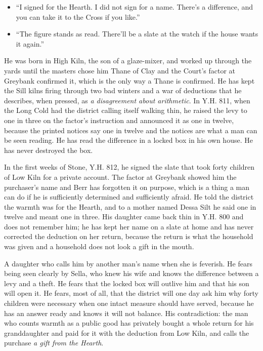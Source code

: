 \documentclass{design/chronicle}
\begin{document}
{\begin{itemize}[leftmargin=1.4em,itemsep=1pt,topsep=3pt,parsep=0pt]
\item “I signed for the Hearth. I did not sign for a name. There’s a difference, and you can take it to the Cross if you like.”

\item “The figure stands as read. There’ll be a slate at the watch if the house wants it again.”

\end{itemize}

He was born in High Kiln, the son of a glaze-mixer, and worked up through the yards until the masters chose him Thane of Clay and the Court’s factor at Greybank confirmed it, which is the only way a Thane is confirmed. He has kept the Sill kilns firing through two bad winters and a war of deductions that he describes, when pressed, as \emph{a disagreement about arithmetic}. In Y.H. 811, when the Long Cold had the district calling itself walking thin, he raised the levy to one in three on the factor’s instruction and announced it as one in twelve, because the printed notices say one in twelve and the notices are what a man can be seen reading. He has read the difference in a locked box in his own house. He has never destroyed the box.

In the first weeks of Stone, Y.H. 812, he signed the slate that took forty children of Low Kiln for a private account. The factor at Greybank showed him the purchaser’s name and Berr has forgotten it on purpose, which is a thing a man can do if he is sufficiently determined and sufficiently afraid. He told the district the warmth was for the Hearth, and to a mother named Dessa Silt he said one in twelve and meant one in three. His daughter came back thin in Y.H. 800 and does not remember him; he has kept her name on a slate at home and has never corrected the deduction on her return, because the return is what the household was given and a household does not look a gift in the mouth.

A daughter who calls him by another man’s name when she is feverish. He fears being seen clearly by Sella, who knew his wife and knows the difference between a levy and a theft. He fears that the locked box will outlive him and that his son will open it. He fears, most of all, that the district will one day ask him why forty children were necessary when one intact measure should have served, because he has an answer ready and knows it will not balance. His contradiction: the man who counts warmth as a public good has privately bought a whole return for his granddaughter and paid for it with the deduction from Low Kiln, and calls the purchase \emph{a gift from the Hearth}.

}
\end{document}
